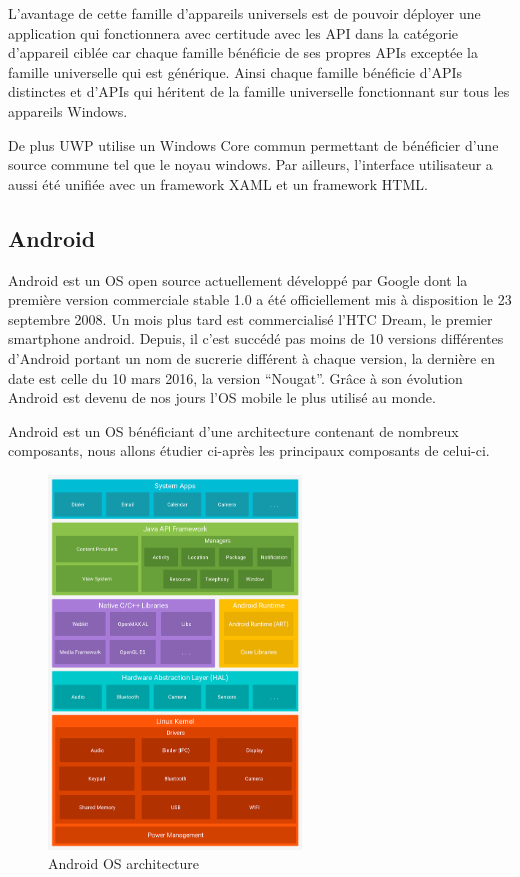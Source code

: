 \documentclass[11]{article}
\begin{document}
L’avantage de cette famille d’appareils universels est de pouvoir déployer une application qui fonctionnera avec certitude avec les API dans la catégorie d’appareil ciblée car chaque famille bénéficie de ses propres APIs exceptée la famille universelle qui est générique. Ainsi chaque famille bénéficie d’APIs distinctes et d’APIs qui héritent de la famille universelle fonctionnant sur tous les appareils Windows.
 
 \vspace{0.5cm}
 
De plus UWP utilise un Windows Core commun permettant de bénéficier d’une source commune tel que le noyau windows. Par ailleurs, l’interface utilisateur a aussi été unifiée avec un framework XAML et un framework HTML.


\subsection{Android}

Android est un OS open source actuellement développé par Google dont la première version commerciale stable 1.0 a été officiellement mis à disposition le 23 septembre 2008. Un mois plus tard est commercialisé l’HTC Dream, le premier smartphone android. Depuis, il c’est succédé pas moins de 10 versions différentes d’Android portant un nom de sucrerie différent à chaque version, la dernière en date est celle du 10 mars 2016, la version “Nougat”. Grâce à son évolution Android est devenu de nos jours l’OS mobile le plus utilisé au monde.

\vspace{0.5cm}

Android est un OS bénéficiant d’une architecture contenant de nombreux composants, nous allons étudier ci-après les principaux composants de celui-ci.

\begin{figure}[h]
    \centering
    \includegraphics[width=0.6\textwidth]{androidos}
    \caption{Android OS architecture}
    \label{bat}
\end{figure}
\end{document}
